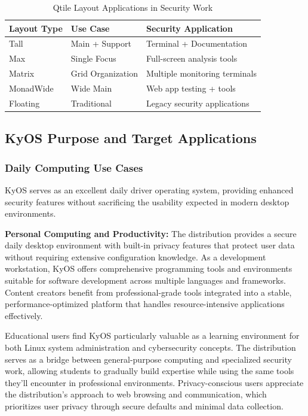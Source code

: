 \documentclass[12pt,a4paper]{article}
\begin{document}
\begin{table}[H]
\centering
\begin{tabular}{@{}lll@{}}
\toprule
\textbf{Layout Type} & \textbf{Use Case} & \textbf{Security Application} \\
\midrule
Tall & Main + Support & Terminal + Documentation \\
Max & Single Focus & Full-screen analysis tools \\
Matrix & Grid Organization & Multiple monitoring terminals \\
MonadWide & Wide Main & Web app testing + tools \\
Floating & Traditional & Legacy security applications \\
\bottomrule
\end{tabular}
\caption{Qtile Layout Applications in Security Work}
\end{table}

\subsection{KyOS Purpose and Target Applications}

\subsubsection{Daily Computing Use Cases}
KyOS serves as an excellent daily driver operating system, providing enhanced security features without sacrificing the usability expected in modern desktop environments.

\textbf{Personal Computing and Productivity:}
The distribution provides a secure daily desktop environment with built-in privacy features that protect user data without requiring extensive configuration knowledge. As a development workstation, KyOS offers comprehensive programming tools and environments suitable for software development across multiple languages and frameworks. Content creators benefit from professional-grade tools integrated into a stable, performance-optimized platform that handles resource-intensive applications effectively.

Educational users find KyOS particularly valuable as a learning environment for both Linux system administration and cybersecurity concepts. The distribution serves as a bridge between general-purpose computing and specialized security work, allowing students to gradually build expertise while using the same tools they'll encounter in professional environments. Privacy-conscious users appreciate the distribution's approach to web browsing and communication, which prioritizes user privacy through secure defaults and minimal data collection.
\end{document}
